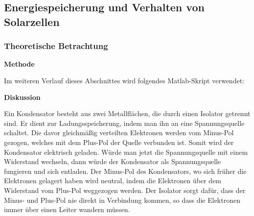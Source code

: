 \subsection {Energiespeicherung und Verhalten von Solarzellen}      %
    \subsubsection{Theoretische Betrachtung}                            %
        \textbf{Methode}
        \newline
        \par
        Im weiteren Verlauf dieses Abschnittes wird folgendes Matlab-Skript verwendet:
        \newline
        
        \textbf{Diskussion}
        \newline
        \par Ein Kondensator besteht aus zwei Metallflächen, die durch einen Isolator getrennt sind. Er dient zur Ladungsspeicherung, indem man ihn an eine Spannungsquelle schaltet. Die davor gleichmäßig verteilten Elektronen werden vom Minus-Pol gezogen, welches mit dem Plus-Pol der Quelle verbunden ist. Somit wird der Kondensator elektrisch geladen. Würde man jetzt die Spannungsquelle mit einem Widerstand wechseln, dann würde der Kondensator als Spannungsquelle fungieren und sich entladen. Der Minus-Pol des Kondensators, wo sich früher die Elektronen gelagert haben wird neutral, indem die Elektronen über dem Widerstand vom Plus-Pol weggezogen werden. Der Isolator sorgt dafür, dass der Minus- und Plus-Pol nie direkt in Verbindung kommen, so dass die Elektronen immer über einen Leiter wandern müssen.
        
